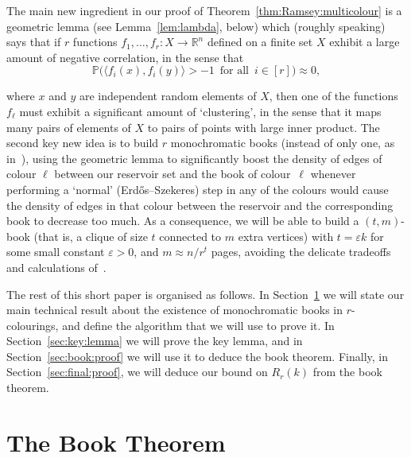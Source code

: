 \documentclass[12pt,reqno]{amsart}
\theoremstyle{definition}
\theoremstyle{remark}
\newcommand\R{\mathbb{R}}
\def\Pr{\mathbb{P}}
\newcommand\eps{\varepsilon}
\renewcommand{\to}{\rightarrow}
\def\eps{\varepsilon}
\def\R{\mathbb{R}}
\def\<{\langle}
\def\>{\rangle}
\begin{document}
The main new ingredient in our proof of Theorem~\ref{thm:Ramsey:multicolour}
is a geometric lemma (see Lemma~\ref{lem:lambda}, below) which (roughly speaking) says that if \(r\) functions \(f_1,\ldots,f_r \colon X \to \R^n\) defined on a finite set \(X\) exhibit a large amount of negative correlation, in the sense that
%
\begin{equation*}
	\Pr\Big( \big\< f_i(x), f_i(y) \big\> > - 1 \,\text{ for all }\, i \in [r] \Big) \approx 0,
\end{equation*}
%

where \(x\) and \(y\) are independent random elements of \(X\), then one of the functions \(f_\ell\) must exhibit a significant amount of `clustering', in the sense that it maps many pairs of elements of \(X\) to pairs of points with large inner product. The second key new idea is to build \(r\) monochromatic books (instead of only one, as in~\cite{CGMS}), using the geometric lemma to significantly boost the density of edges of colour \(\ell\) between our reservoir set and the book of colour~\(\ell\) whenever performing a `normal' (Erd\H{o}s--Szekeres) step in any of the colours would cause the density of edges in that colour between the reservoir and the corresponding book to decrease too much. As a consequence, we will be able to build a \((t,m)\)-book (that is, a clique of size \(t\) connected to \(m\) extra vertices) with \(t = \eps k\) for some small constant \(\eps > 0\), and \(m \approx n / r^t\) pages, avoiding the delicate tradeoffs and calculations of~\cite{CGMS}.

The rest of this short paper is organised as follows. In Section~\ref{sec:book:thm} we will state our main technical result about the existence of monochromatic books in \(r\)-colourings, and define the algorithm that we will use to prove it. In Section~\ref{sec:key:lemma} we will prove the key lemma, and in Section~\ref{sec:book:proof} we will use it to deduce the book theorem. Finally, in Section~\ref{sec:final:proof}, we will deduce our bound on \(R_r(k)\) from the book theorem.

\section{The Book Theorem}\label{sec:book:thm}
\end{document}
